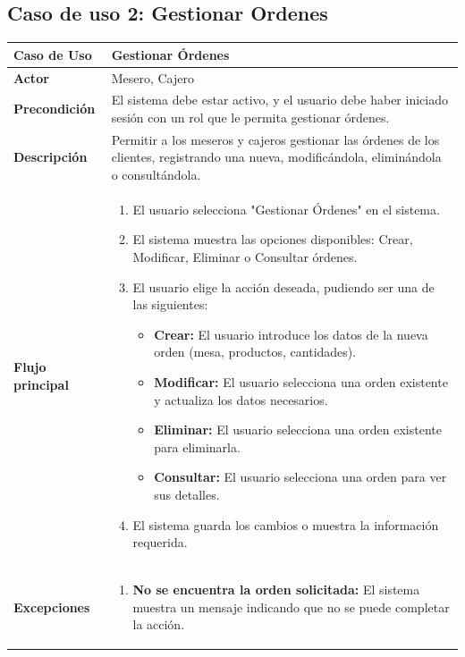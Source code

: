 \documentclass{article}
\begin{document}

\subsection{Caso de uso 2: Gestionar Ordenes}

\begin{table}[H]
    \centering
    \begin{tabular}{|l|p{12cm}|}
    \hline
    \textbf{Caso de Uso} & \textbf{Gestionar Órdenes} \\ \hline
    \textbf{Actor} & Mesero, Cajero \\ \hline
    \textbf{Precondición} & El sistema debe estar activo, y el usuario debe haber iniciado sesión con un rol que le permita gestionar órdenes. \\ \hline
    \textbf{Descripción} & Permitir a los meseros y cajeros gestionar las órdenes de los clientes, registrando una nueva, modificándola, eliminándola o consultándola. \\ \hline
    \textbf{Flujo principal} & 
    \begin{enumerate}
        \item El usuario selecciona "Gestionar Órdenes" en el sistema.
        \item El sistema muestra las opciones disponibles: Crear, Modificar, Eliminar o Consultar órdenes.
        \item El usuario elige la acción deseada, pudiendo ser una de las siguientes:
        \begin{itemize}
            \item \textbf{Crear:} El usuario introduce los datos de la nueva orden (mesa, productos, cantidades).
            \item \textbf{Modificar:} El usuario selecciona una orden existente y actualiza los datos necesarios.
            \item \textbf{Eliminar:} El usuario selecciona una orden existente para eliminarla.
            \item \textbf{Consultar:} El usuario selecciona una orden para ver sus detalles.
        \end{itemize}
        \item El sistema guarda los cambios o muestra la información requerida.
    \end{enumerate} \\ \hline
    \textbf{Excepciones} & 
    \begin{enumerate}
        \item \textbf{No se encuentra la orden solicitada:} El sistema muestra un mensaje indicando que no se puede completar la acción.

\end{enumerate}
\end{tabular}
\end{table}
\end{document}
